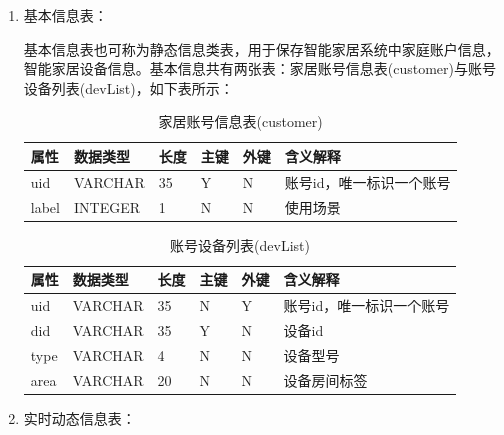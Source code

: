 \begin{CJK*}{UTF8}{song}
\begin{enumerate}
    \item 基本信息表：
    
基本信息表也可称为静态信息类表，用于保存智能家居系统中家庭账户信息，智能家居设备信息。基本信息共有两张表：家居账号信息表(customer)与账号设备列表(devList)，如下表所示：
    \begin{table}[H]
    \centering
    \caption{家居账号信息表(customer)}
    \vspace{2mm}
    \small
    \begin{tabular}{lllllp{2cm}}
    \toprule
        \textbf{属性} & \textbf{数据类型} & \textbf{长度} & \textbf{主键} & \textbf{外键} & \textbf{含义解释} \\
        \hline
        uid & VARCHAR & 35 & Y & N & 账号id，唯一标识一个账号 \\
        label & INTEGER & 1 & N & N & 使用场景 \\
        \bottomrule
    \end{tabular}
    \label{tab1}
    \end{table}
    \begin{table}[H]
    \centering
    \caption{账号设备列表(devList)}
    \vspace{2mm}
    \small
    \begin{tabular}{lllllp{2cm}}
    \toprule
        \textbf{属性} & \textbf{数据类型} & \textbf{长度} & \textbf{主键} & \textbf{外键} & \textbf{含义解释} \\
        \hline
        uid & VARCHAR & 35 & N & Y & 账号id，唯一标识一个账号 \\
        did & VARCHAR & 35 & Y & N & 设备id \\
        type & VARCHAR & 4 & N & N & 设备型号 \\
        area & VARCHAR & 20 & N & N & 设备房间标签 \\
        \bottomrule
    \end{tabular}
    \label{tab1}
    \end{table}
    \item 实时动态信息表：
    

\end{enumerate}
\end{CJK*}
